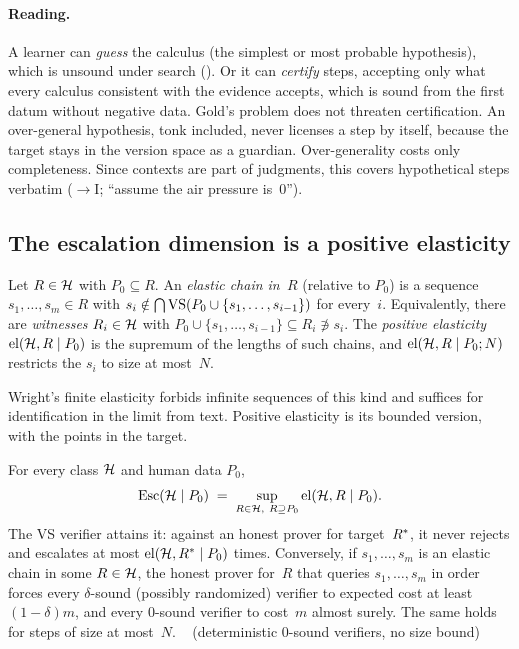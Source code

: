 \paragraph{Reading.} A learner can \emph{guess} the calculus (the simplest or most probable hypothesis), which is unsound under search (). Or it can \emph{certify} steps, accepting only what every calculus consistent with the evidence accepts, which is sound from the first datum without negative data. Gold's problem \citep{gold1967language} does not threaten certification. An over-general hypothesis, tonk included, never licenses a step by itself, because the target stays in the version space as a guardian. Over-generality costs only completeness. Since contexts are part of judgments, this covers hypothetical steps verbatim ($\to$I; ``assume the air pressure is~$0$'').

\subsection{The escalation dimension is a positive elasticity}\label{sec:caution:esc}

\begin{definition}\label{def:caution:elastic}
Let $R\in\mathcal{H}$ with $P_0\subseteq R$. An \emph{elastic chain in~$R$} (relative to $P_0$) is a sequence $s_1,\dots,s_m\in R$ with $s_i\notin\bigcap\mathrm{VS}(P_0\cup\{s_1,\dots,s_{i-1}\})$ for every~$i$. Equivalently, there are \emph{witnesses} $R_i\in\mathcal{H}$ with $P_0\cup\{s_1,\dots,s_{i-1}\}\subseteq R_i\not\ni s_i$. The \emph{positive elasticity} $\mathrm{el}(\mathcal{H},R\mid P_0)$ is the supremum of the lengths of such chains, and $\mathrm{el}(\mathcal{H},R\mid P_0;N)$ restricts the $s_i$ to size at most~$N$.
\end{definition}

Wright's finite elasticity \citep{wright1989identification,motoki1991correct} forbids infinite sequences of this kind and suffices for identification in the limit from text. Positive elasticity is its bounded version, with the points in the target.

\begin{theorem}[Escalation dimension $=$ positive elasticity]\label{thm:caution:esc}
For every class $\mathcal{H}$ and human data $P_0$,
\[
\Esc(\Hc\mid P_0)\;=\;\sup_{R\in\Hc,\ R\supseteq P_0}\el(\Hc,R\mid P_0).
\]
The VS verifier attains it: against an honest prover for target~$R^{*}$, it never rejects and escalates at most $\mathrm{el}(\mathcal{H},R^{*}\mid P_0)$ times. Conversely, if $s_1,\dots,s_m$ is an elastic chain in some $R\in\mathcal{H}$, the honest prover for~$R$ that queries $s_1,\dots,s_m$ in order forces every $\delta$-sound (possibly randomized) verifier to expected cost at least $(1-\delta)m$, and every $0$-sound verifier to cost~$m$ almost surely. The same holds for steps of size at most~$N$.
\hfill{}\  (deterministic $0$-sound verifiers, no size bound)
\end{theorem}

